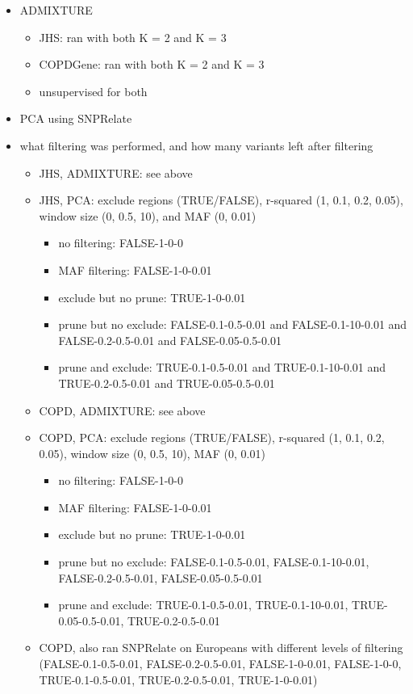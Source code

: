 \documentclass[12pt]{article}
\begin{document}
\begin{itemize}
\item ADMIXTURE
	\begin{itemize}
	\item JHS: ran with both K = 2 and K = 3
	\item COPDGene: ran with both K = 2 and K = 3
	\item unsupervised for both
	\end{itemize}
\item PCA using SNPRelate
\item what filtering was performed, and how many variants left after filtering
	\begin{itemize}
	\item JHS, ADMIXTURE: see above
	\item JHS, PCA: exclude regions (TRUE/FALSE), r-squared (1, 0.1, 0.2, 0.05), window size (0, 0.5, 10), and MAF (0, 0.01) 
		\begin{itemize}
		\item no filtering: FALSE-1-0-0
		\item MAF filtering: FALSE-1-0-0.01
		\item exclude but no prune: TRUE-1-0-0.01
		\item prune but no exclude: FALSE-0.1-0.5-0.01 and FALSE-0.1-10-0.01 and FALSE-0.2-0.5-0.01 and FALSE-0.05-0.5-0.01
		\item prune and exclude: TRUE-0.1-0.5-0.01 and TRUE-0.1-10-0.01 and TRUE-0.2-0.5-0.01 and TRUE-0.05-0.5-0.01
		\end{itemize}
	\item COPD, ADMIXTURE: see above
	\item COPD, PCA: exclude regions (TRUE/FALSE), r-squared (1, 0.1, 0.2, 0.05), window size (0, 0.5, 10), MAF (0, 0.01)
		\begin{itemize}
		\item no filtering: FALSE-1-0-0
		\item MAF filtering: FALSE-1-0-0.01
		\item exclude but no prune: TRUE-1-0-0.01
		\item prune but no exclude: FALSE-0.1-0.5-0.01, FALSE-0.1-10-0.01, FALSE-0.2-0.5-0.01, FALSE-0.05-0.5-0.01
		\item prune and exclude: TRUE-0.1-0.5-0.01, TRUE-0.1-10-0.01, TRUE-0.05-0.5-0.01, TRUE-0.2-0.5-0.01
		\end{itemize}	
	\item COPD, also ran SNPRelate on Europeans with different levels of filtering (FALSE-0.1-0.5-0.01, FALSE-0.2-0.5-0.01, FALSE-1-0-0.01, FALSE-1-0-0, TRUE-0.1-0.5-0.01, TRUE-0.2-0.5-0.01, TRUE-1-0-0.01)
	\end{itemize}
\end{itemize}
\end{document}
